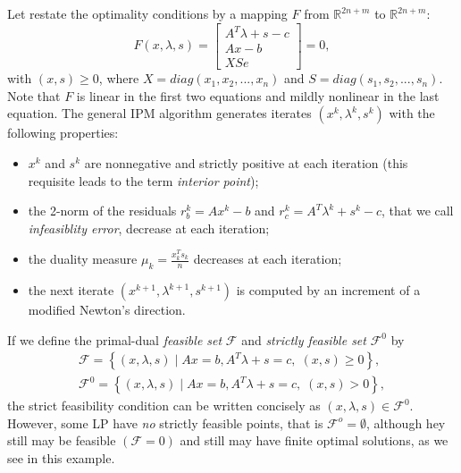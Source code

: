 \documentclass[a4paper,10 pt,titlepage,twoside]{book}
\theoremstyle{plain}
\theoremstyle{definition}
\theoremstyle{remark}
\begin{document}
 Let restate the optimality conditions by a mapping $\mathit{F}$ from $\mathbb{R}^{2n+m}$ to $\mathbb{R}^{2n+m}$:
\begin{equation}\label{F}
	\mathit{F}(x,\lambda,s)= \begin{bmatrix}
	A^{T}\lambda+s-c \\Ax-b \\XSe
	\end{bmatrix}=0,
\end{equation}
with $(x,s)\geq0$, where $X = diag(x_{1}, x_{2},...,x_{n})$ and $S = diag(s_{1}, s_{2},...,s_{n})$.\\
Note that $\mathit{F}$ is linear in the first two equations and mildly nonlinear in the last equation. 
The general IPM algorithm generates iterates $(x^{k},\lambda^{k},s^{k})$ with the following properties:
\begin{itemize}
	\item $x^{k}$ and $s^{k}$ are nonnegative and strictly positive at each iteration (this requisite leads to the term \textit{interior point});
	\item the 2-norm of the residuals $r_{b}^{k} = Ax^{k} - b$ and $r_{c}^{k} =A^{T}\lambda^{k} +s^{k} - c$, that we call \textit{infeasiblity error}, decrease at each iteration;
	\item the duality measure $\mu_{k} = \frac{x^{T}_{k}s_{k}}{n}$ decreases at each iteration;
	\item the next iterate $(x^{k+1},\lambda^{k+1},s^{k+1})$ is computed by an increment of a modified Newton's direction.
\end{itemize}
If we define the primal-dual \textit{feasible set} $\mathcal{F}$ and \textit{strictly feasible set} $\mathcal{F}^{0}$ by
\begin{align*}
\mathcal{F} = \left\lbrace(x,\lambda,s)\;|\;Ax = b, A^{T}\lambda+s =c,\;(x,s)\geq0\right\rbrace, \\
\mathcal{F}^{0} = \left\lbrace(x,\lambda,s)\;|\;Ax = b, A^{T}\lambda+s =c,\;(x,s)>0\right\rbrace, 
\end{align*}
the strict feasibility condition can be written concisely as $(x,\lambda,s)\in\mathcal{F}^{0}$.\\
However, some LP have \textit{no} strictly feasible points, that is $\mathcal{F}^{o}=\emptyset$, although hey still may be feasible $(\mathcal{F}=0)$ and still may have finite optimal solutions, as we see in this example.
\end{document}
